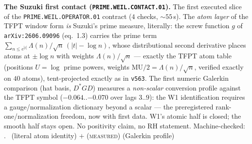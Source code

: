 \documentclass[11pt,a4paper]{article}
\theoremstyle{definition}
\begin{document}
\par\smallskip\noindent\textbf{The Suzuki first contact
(\texttt{PRIME.WEIL.CONTACT.01}).}
The first executed slice of the \texttt{PRIME.WEIL.OPERATOR.01}
contract ($4$ checks, ${\sim}55$\,s).  The \emph{atom layer} of the
TFPT window form \emph{is} Suzuki's prime measure, literally: the
screw function $g$ of \texttt{arXiv:2606.09096} (eq.~1.3) carries the
prime term $\sum_{n\le e^{|t|}}\Lambda(n)/\sqrt n\,(|t|-\log n)$,
whose distributional second derivative places atoms at $\pm\log n$
with weights $\Lambda(n)/\sqrt n$ --- exactly the TFPT atom table
(positions $U=\log$ prime powers, weights $\mathrm{MU}/2=
\Lambda(n)/\sqrt n$, verified exactly on $40$ atoms), tent-projected
exactly as in \texttt{v563}.  The first numeric Galerkin comparison
(hat basis, $D^*GD$) measures a \emph{non-scalar} conversion profile
against the TFPT symbol ($-0.064..{-0.070}$ over lags $3..9$): the W1
identification requires a gauge/normalization dictionary beyond a
scalar --- the preregistered rank-one/normalization freedom, now with
first data.  W1's atomic half is closed; the smooth half stays open.
No positivity claim, no RH statement.
Machine-checked: .
\mE\ (literal atom identity) $+$ (\textsc{measured}) (Galerkin profile)
\par\smallskip
\end{document}
